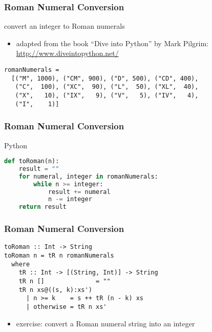 \documentclass[dvipsnames]{beamer}
\theoremstyle{plain}
\begin{document}
\begin{frame}[fragile]
  \frametitle{Roman Numeral Conversion}

  \begin{exampleblock}{convert an integer to Roman numerals}
    \begin{itemize}
      \item adapted from the book ``Dive into Python'' by Mark Pilgrim:\\
        \url{http://www.diveintopython.net/}
    \end{itemize}

    \medskip
    \begin{lstlisting}
romanNumerals =
  [("M", 1000), ("CM", 900), ("D", 500), ("CD", 400),
   ("C",  100), ("XC",  90), ("L",  50), ("XL",  40),
   ("X",   10), ("IX",   9), ("V",   5), ("IV",   4),
   ("I",    1)]
    \end{lstlisting}
  \end{exampleblock}
\end{frame}

\begin{frame}[fragile]
  \frametitle{Roman Numeral Conversion}

  \begin{exampleblock}{Python}
    \begin{lstlisting}[language=Python]
def toRoman(n):
    result = ""
    for numeral, integer in romanNumerals:
        while n >= integer:
            result += numeral
            n -= integer
    return result
    \end{lstlisting}
  \end{exampleblock}
\end{frame}

\begin{frame}[fragile]
  \frametitle{Roman Numeral Conversion}

  \begin{exampleblock}{}
    \begin{lstlisting}
toRoman :: Int -> String
toRoman n = tR n romanNumerals
  where
    tR :: Int -> [(String, Int)] -> String
    tR n []              = ""
    tR n xs@((s, k):xs')
      | n >= k    = s ++ tR (n - k) xs
      | otherwise = tR n xs'
    \end{lstlisting}
  \end{exampleblock}

  \pause
  \begin{itemize}
    \item exercise: convert a Roman numeral string into an integer
  \end{itemize}
\end{frame}
\end{document}
